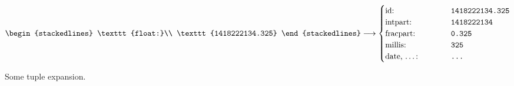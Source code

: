 \begin{figure}[H]
   $\begin{stackedlines}
    \texttt{float:}\\
    \texttt{1418222134.325}
  \end{stackedlines} \longrightarrow
  \begin{cases}
    \text{id: } & \texttt{1418222134.325}\\
    \text{intpart: } & \texttt{1418222134}\\
    \text{fracpart: } & \texttt{0.325}\\
    \text{millis: } & \texttt{325}\\
    \text{\parbox{\widthof{base-10 residue:}}{date, \ldots:} } & \texttt{\ldots}
  \end{cases}$

  \caption{Some tuple expansion.}
  \label{fig:tuple-expansion}
\end{figure}